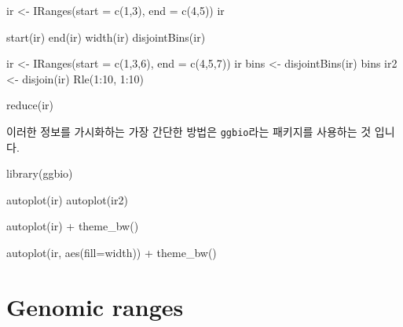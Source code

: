 \documentclass[
]{book}
\newenvironment{Shaded}{\begin{snugshade}}{\end{snugshade}}
\newcommand{\AttributeTok}[1]{\textcolor[rgb]{0.77,0.63,0.00}{#1}}
\newcommand{\DecValTok}[1]{\textcolor[rgb]{0.00,0.00,0.81}{#1}}
\newcommand{\FunctionTok}[1]{\textcolor[rgb]{0.00,0.00,0.00}{#1}}
\newcommand{\NormalTok}[1]{#1}
\newcommand{\OtherTok}[1]{\textcolor[rgb]{0.56,0.35,0.01}{#1}}
\newcommand{\SpecialCharTok}[1]{\textcolor[rgb]{0.00,0.00,0.00}{#1}}
\begin{document}
\begin{Shaded}
\begin{Highlighting}[]
\NormalTok{ir }\OtherTok{\textless{}{-}} \FunctionTok{IRanges}\NormalTok{(}\AttributeTok{start =} \FunctionTok{c}\NormalTok{(}\DecValTok{1}\NormalTok{,}\DecValTok{3}\NormalTok{), }\AttributeTok{end =} \FunctionTok{c}\NormalTok{(}\DecValTok{4}\NormalTok{,}\DecValTok{5}\NormalTok{))}
\NormalTok{ir}

\FunctionTok{start}\NormalTok{(ir)}
\FunctionTok{end}\NormalTok{(ir)}
\FunctionTok{width}\NormalTok{(ir)}
\FunctionTok{disjointBins}\NormalTok{(ir)}


\NormalTok{ir }\OtherTok{\textless{}{-}} \FunctionTok{IRanges}\NormalTok{(}\AttributeTok{start =} \FunctionTok{c}\NormalTok{(}\DecValTok{1}\NormalTok{,}\DecValTok{3}\NormalTok{,}\DecValTok{6}\NormalTok{), }\AttributeTok{end =} \FunctionTok{c}\NormalTok{(}\DecValTok{4}\NormalTok{,}\DecValTok{5}\NormalTok{,}\DecValTok{7}\NormalTok{))}
\NormalTok{ir}
\NormalTok{bins }\OtherTok{\textless{}{-}} \FunctionTok{disjointBins}\NormalTok{(ir)}
\NormalTok{bins}
\NormalTok{ir2 }\OtherTok{\textless{}{-}} \FunctionTok{disjoin}\NormalTok{(ir)}
\FunctionTok{Rle}\NormalTok{(}\DecValTok{1}\SpecialCharTok{:}\DecValTok{10}\NormalTok{, }\DecValTok{1}\SpecialCharTok{:}\DecValTok{10}\NormalTok{)}


\FunctionTok{reduce}\NormalTok{(ir)}
\end{Highlighting}
\end{Shaded}

이러한 정보를 가시화하는 가장 간단한 방법은 \texttt{ggbio}라는 패키지를 사용하는 것 입니다.

\begin{Shaded}
\begin{Highlighting}[]
\FunctionTok{library}\NormalTok{(ggbio)}

\FunctionTok{autoplot}\NormalTok{(ir) }
\FunctionTok{autoplot}\NormalTok{(ir2) }

\FunctionTok{autoplot}\NormalTok{(ir) }\SpecialCharTok{+} 
  \FunctionTok{theme\_bw}\NormalTok{()}

\FunctionTok{autoplot}\NormalTok{(ir, }\FunctionTok{aes}\NormalTok{(}\AttributeTok{fill=}\NormalTok{width)) }\SpecialCharTok{+}
  \FunctionTok{theme\_bw}\NormalTok{()}
\end{Highlighting}
\end{Shaded}

\hypertarget{genomic-ranges}{%
\section{Genomic ranges}\label{genomic-ranges}}
\end{document}
